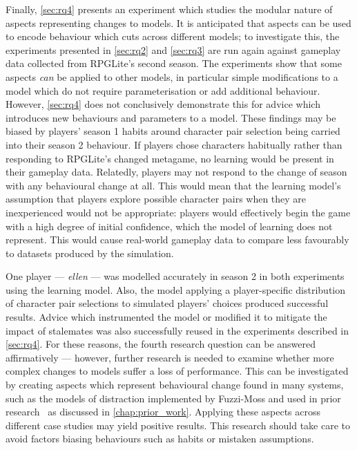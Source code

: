 Finally, \cref{sec:rq4} presents an experiment which studies the modular nature
of aspects representing changes to models. It is anticipated that aspects can be
used to encode behaviour which cuts across different models; to investigate
this, the experiments presented in \cref{sec:rq2} and \cref{sec:rq3} are run
again against gameplay data collected from RPGLite's second season. The
experiments show that some aspects \emph{can} be applied to other models, in
particular simple modifications to a model which do not require parameterisation
or add additional behaviour. However, \cref{sec:rq4} does not conclusively
demonstrate this for advice which introduces new behaviours and parameters to a
model. These findings may be biased by players' season 1 habits around character
pair selection being carried into their season 2 behaviour. If players chose
characters habitually rather than responding to RPGLite's changed metagame, no
learning would be present in their gameplay data. Relatedly, players may not
respond to the change of season with any behavioural change at all. This would
mean that the learning model's assumption that players explore possible
character pairs when they are inexperienced would not be appropriate: players
would effectively begin the game with a high degree of initial confidence, which
the model of learning does not represent. This would cause real-world gameplay
data to compare less favourably to datasets produced by the simulation.

One player --- \emph{ellen} --- was modelled accurately in season 2 in both
experiments using the learning model. Also, the model applying a player-specific
distribution of character pair selections to simulated players' choices produced
successful results. Advice which instrumented the model or modified it to
mitigate the impact of stalemates was also successfully reused in the
experiments described in \cref{sec:rq4}. For these reasons, the fourth research
question can be answered affirmatively --- however, further research is needed
to examine whether more complex changes to models suffer a loss of performance.
This can be investigated by creating
aspects which represent behavioural change found in many systems, such as the
models of distraction implemented by Fuzzi-Moss\cite{fuzzimoss_repo} and used in
prior research~\cite{wallis2018caise} as discussed in \cref{chap:prior_work}.
Applying these aspects across different case studies may yield positive results.
This research should take care to avoid factors biasing behaviours such as
habits or mistaken assumptions.







